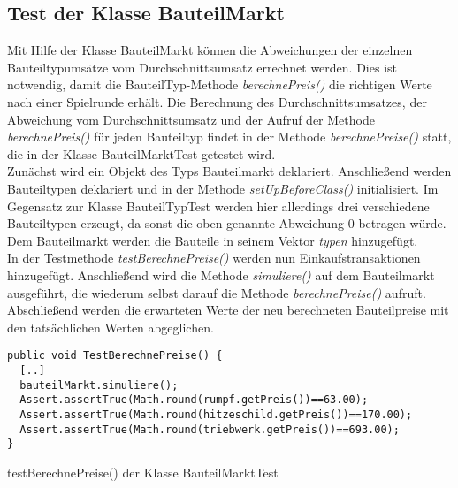\subsection{Test der Klasse BauteilMarkt}
\label{sub:junit-spiellogik-bauteilmarkt}  

Mit Hilfe der Klasse BauteilMarkt können die Abweichungen der einzelnen Bauteiltypumsätze vom Durchschnittsumsatz errechnet werden. Dies ist notwendig, damit die BauteilTyp-Methode \textit{berechnePreis()} die richtigen Werte nach einer Spielrunde erhält. Die Berechnung des Durchschnittsumsatzes, der Abweichung vom Durchschnittsumsatz und der Aufruf der Methode \textit{berechnePreis()} für jeden Bauteiltyp findet in der Methode \textit{berechnePreise()} statt, die in der Klasse BauteilMarktTest getestet wird.
\\
Zunächst wird ein Objekt des Typs Bauteilmarkt deklariert. Anschließend werden Bauteiltypen deklariert und in der Methode \textit{setUpBeforeClass()} initialisiert. Im Gegensatz zur Klasse BauteilTypTest werden hier allerdings drei verschiedene Bauteiltypen erzeugt, da sonst die oben genannte Abweichung 0 betragen würde. Dem Bauteilmarkt werden die Bauteile in seinem Vektor \textit{typen} hinzugefügt.
\\
In der Testmethode \textit{testBerechnePreise()} werden nun Einkaufstransaktionen hinzugefügt. Anschließend wird die Methode \textit{simuliere()} auf dem Bauteilmarkt ausgeführt, die wiederum selbst darauf die Methode \textit{berechnePreise()} aufruft. Abschließend werden die erwarteten Werte der neu berechneten Bauteilpreise mit den tatsächlichen Werten abgeglichen.

\begin{programm}[ht]
\begin{lstlisting}[breaklines=true]
public void TestBerechnePreise() {
  [..]
  bauteilMarkt.simuliere();
  Assert.assertTrue(Math.round(rumpf.getPreis())==63.00);
  Assert.assertTrue(Math.round(hitzeschild.getPreis())==170.00);
  Assert.assertTrue(Math.round(triebwerk.getPreis())==693.00);
}
\end{lstlisting}
\caption{testBerechnePreise() der Klasse BauteilMarktTest\label{sub:junit-spiellogik-bauteilmarkt}}
\end{programm}
 
